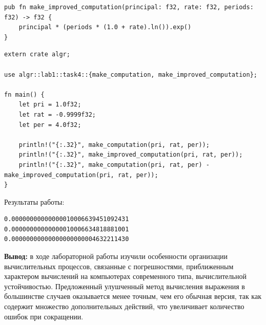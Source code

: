 \documentclass[a4paper,14pt]{extarticle}
\begin{document}
\begin{enumerate}[1.]
\begin{verbatim}
pub fn make_improved_computation(principal: f32, rate: f32, periods: f32) -> f32 {
    principal * (periods * (1.0 + rate).ln()).exp()
}
            \end{verbatim}

\begin{verbatim}
extern crate algr;

use algr::lab1::task4::{make_computation, make_improved_computation};

fn main() {
    let pri = 1.0f32;
    let rat = -0.9999f32;
    let per = 4.0f32;

    println!("{:.32}", make_computation(pri, rat, per));
    println!("{:.32}", make_improved_computation(pri, rat, per));
    println!("{:.32}", make_computation(pri, rat, per) - make_improved_computation(pri, rat, per));
}
\end{verbatim}
            Результаты работы:
            \begin{verbatim}
0.00000000000000010006639451092431
0.00000000000000010006634818881001
0.00000000000000000000004632211430
            \end{verbatim} 
\end{enumerate}

\textbf{Вывод: } в ходе лабораторной работы изучили особенности организации вычислительных процессов, связанные с
погрешностями, приближенным характером вычислений на компьютерах современного типа,
вычислительной устойчивостью. Предложенный улушченный метод вычисления выражения в большинстве случаев 
оказывается менее точным, чем его обычная версия, так как содержит множество дополнительных действий, 
что увеличивает количество ошибок при сокращении.
\end{document}
